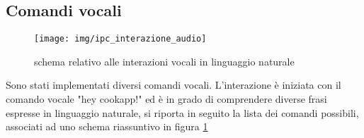 \subsection{Comandi vocali}
\begin{figure}[H]
	\texttt{[image: img/ipc\_interazione\_audio]}
	\caption{schema relativo alle interazioni vocali in linguaggio naturale}
	\label{fig:ipcvocali}
\end{figure}
Sono stati implementati diversi comandi vocali.  L'interazione è iniziata
con il comando vocale "hey cookapp!" ed è in grado di comprendere diverse frasi
espresse in linguaggio naturale, si riporta in seguito la lista dei comandi
possibili, associati ad uno schema riassuntivo in figura \ref{fig:ipcvocali}

